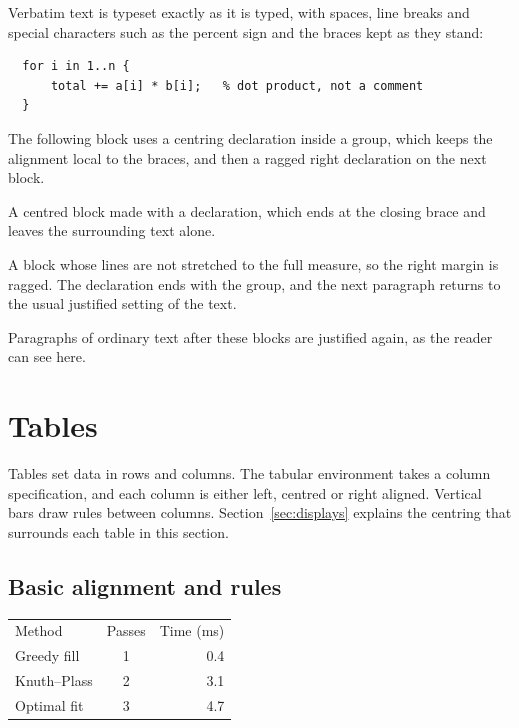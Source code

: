 \documentclass{article}
\begin{document}
Verbatim text is typeset exactly as it is typed, with spaces, line breaks and special
characters such as the percent sign and the braces kept as they stand:

\begin{verbatim}
  for i in 1..n {
      total += a[i] * b[i];   % dot product, not a comment
  }
\end{verbatim}

The following block uses a centring declaration inside a group, which keeps the
alignment local to the braces, and then a ragged right declaration on the next block.

{\centering A centred block made with a declaration, which ends at the closing
brace and leaves the surrounding text alone.\par}

{\raggedright A block whose lines are not stretched to the full measure, so the
right margin is ragged. The declaration ends with the group, and the next paragraph
returns to the usual justified setting of the text.\par}

Paragraphs of ordinary text after these blocks are justified again, as the reader can
see here.

\section{Tables}\label{sec:tables}

Tables set data in rows and columns. The tabular environment takes a column
specification, and each column is either left, centred or right aligned. Vertical bars
draw rules between columns. Section~\ref{sec:displays} explains the centring that surrounds each table in
this section.

\subsection{Basic alignment and rules}\label{sec:tables-basic}

\begin{center}
\begin{tabular}{l c r}
Method & Passes & Time (ms) \\
Greedy fill      & 1 & 0.4 \\
Knuth--Plass     & 2 & 3.1 \\
Optimal fit      & 3 & 4.7 \\
\end{tabular}
\end{center}
\end{document}
